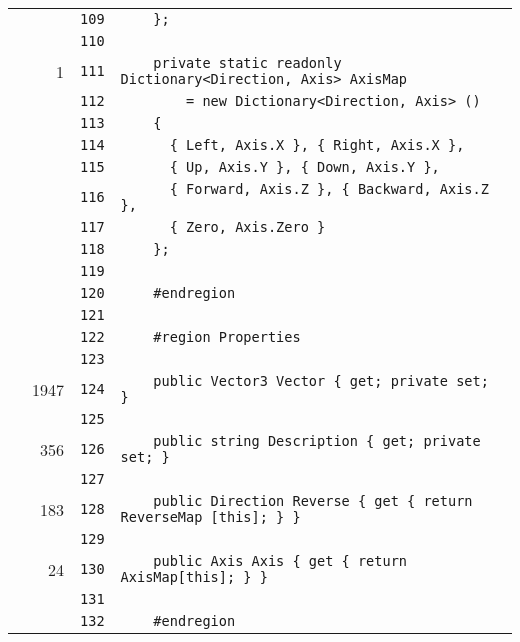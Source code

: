 \documentclass[a4paper,10pt]{article}
\begin{document}
\begin{longtable}[l]{lrrl}
\cellcolor{gray} &  & \verb~109~ & \verb~    };~\\
\cellcolor{gray} &  & \verb~110~ & \verb~~\\
\cellcolor{green} & 1 & \verb~111~ & \verb~    private static readonly Dictionary<Direction, Axis> AxisMap~\\
\cellcolor{gray} &  & \verb~112~ & \verb~        = new Dictionary<Direction, Axis> ()~\\
\cellcolor{gray} &  & \verb~113~ & \verb~    {~\\
\cellcolor{gray} &  & \verb~114~ & \verb~      { Left, Axis.X }, { Right, Axis.X },~\\
\cellcolor{gray} &  & \verb~115~ & \verb~      { Up, Axis.Y }, { Down, Axis.Y },~\\
\cellcolor{gray} &  & \verb~116~ & \verb~      { Forward, Axis.Z }, { Backward, Axis.Z },~\\
\cellcolor{gray} &  & \verb~117~ & \verb~      { Zero, Axis.Zero }~\\
\cellcolor{gray} &  & \verb~118~ & \verb~    };~\\
\cellcolor{gray} &  & \verb~119~ & \verb~~\\
\cellcolor{gray} &  & \verb~120~ & \verb~    #endregion~\\
\cellcolor{gray} &  & \verb~121~ & \verb~~\\
\cellcolor{gray} &  & \verb~122~ & \verb~    #region Properties~\\
\cellcolor{gray} &  & \verb~123~ & \verb~~\\
\cellcolor{green} & 1947 & \verb~124~ & \verb~    public Vector3 Vector { get; private set; }~\\
\cellcolor{gray} &  & \verb~125~ & \verb~~\\
\cellcolor{green} & 356 & \verb~126~ & \verb~    public string Description { get; private set; }~\\
\cellcolor{gray} &  & \verb~127~ & \verb~~\\
\cellcolor{green} & 183 & \verb~128~ & \verb~    public Direction Reverse { get { return ReverseMap [this]; } }~\\
\cellcolor{gray} &  & \verb~129~ & \verb~~\\
\cellcolor{green} & 24 & \verb~130~ & \verb~    public Axis Axis { get { return AxisMap[this]; } }~\\
\cellcolor{gray} &  & \verb~131~ & \verb~~\\
\cellcolor{gray} &  & \verb~132~ & \verb~    #endregion~\\

\end{longtable}
\end{document}
